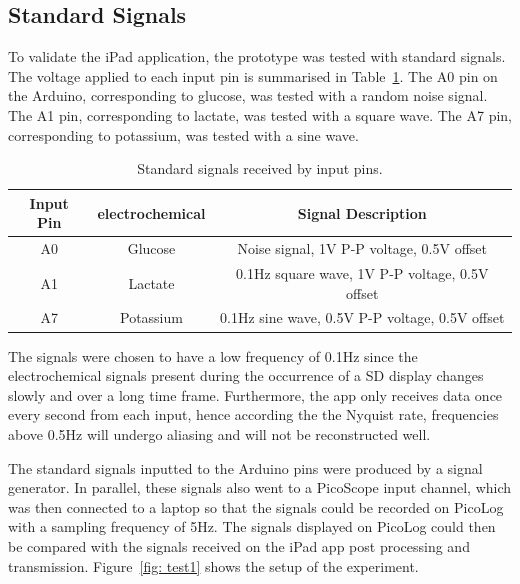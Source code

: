 \subsection{Standard Signals}
To validate the iPad application, the prototype was tested with standard signals. The voltage applied to each input pin is summarised in Table~\ref{table: standard signals}. The A0 pin on the Arduino, corresponding to glucose, was tested with a random noise signal. The A1 pin, corresponding to lactate, was tested with a square wave. The A7 pin, corresponding to potassium, was tested with a sine wave. 

\begin{table}[h!]
\centering
\begin{tabular}{||c c c||} 
 \hline
 Input Pin & electrochemical & Signal Description \\ [0.5ex] 
 \hline\hline
 A0 & Glucose & Noise signal, 1V P-P voltage, 0.5V offset \\
 A1 & Lactate & 0.1Hz square wave, 1V P-P voltage, 0.5V offset \\
 A7 & Potassium & 0.1Hz sine wave, 0.5V P-P voltage, 0.5V offset \\
 \hline
\end{tabular}
\caption{Standard signals received by input pins.}
\label{table: standard signals}
\end{table}

The signals were chosen to have a low frequency of 0.1Hz since the electrochemical signals present during the occurrence of a SD display changes slowly and over a long time frame. Furthermore, the app only receives data once every second from each input, hence according the the Nyquist rate, frequencies above 0.5Hz will undergo aliasing and will not be reconstructed well.

The standard signals inputted to the Arduino pins were produced by a signal generator. In parallel, these signals also went to a PicoScope input channel, which was then connected to a laptop so that the signals could be recorded on PicoLog with a sampling frequency of 5Hz. The signals displayed on PicoLog could then be compared with the signals received on the iPad app post processing and transmission. Figure~\ref{fig: test1} shows the setup of the experiment.

